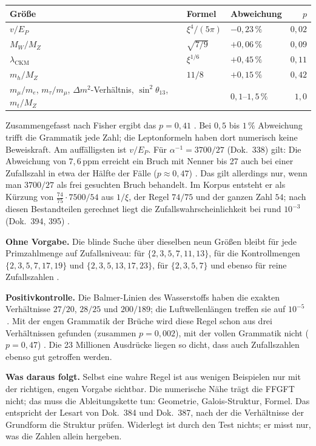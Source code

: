 \begin{center}
\small
\begin{tabular}{@{}lllr@{}}
\toprule
\textbf{Größe} & \textbf{Formel} & \textbf{Abweichung} & \textbf{$p$} \\
\midrule
$v/E_P$ & $\xi^4/(5\pi)$ & $-0{,}23\,\%$ & $0{,}02$ \\
$M_W/M_Z$ & $\sqrt{7/9}$ & $+0{,}06\,\%$ & $0{,}09$ \\
$\lambda_{\mathrm{CKM}}$ & $\xi^{1/6}$ & $+0{,}45\,\%$ & $0{,}11$ \\
$m_h/M_Z$ & $11/8$ & $+0{,}15\,\%$ & $0{,}42$ \\
$m_\mu/m_e$, $m_\tau/m_\mu$, $\Delta m^2$-Verhältnis, $\sin^2\theta_{13}$, $m_t/M_Z$ &  & $0{,}1$--$1{,}5\,\%$ & $1{,}0$ \\
\bottomrule
\end{tabular}
\end{center}

\noindent Zusammengefasst nach Fisher ergibt das $p=0{,}41$ \KM. Bei $0{,}5$ bis $1\,\%$ Abweichung
trifft die Grammatik jede Zahl; die Leptonformeln haben dort numerisch keine Beweiskraft. Am
auffälligsten ist $v/E_P$. Für $\alpha^{-1}=3700/27$ (Dok.~338) gilt: Die Abweichung von $7{,}6$\,ppm
erreicht ein Bruch mit Nenner bis 27 auch bei einer Zufallszahl in etwa der Hälfte der Fälle
($p\approx0{,}47$) \KM. Das gilt allerdings nur, wenn man $3700/27$ als frei gesuchten Bruch
behandelt. Im Korpus entsteht er als Kürzung von $\tfrac{74}{75}\cdot7500/54$ aus $1/\xi$, der Regel
$74/75$ und der ganzen Zahl $54$; nach diesen Bestandteilen gerechnet liegt die
Zufallswahrscheinlichkeit bei rund $10^{-3}$ (Dok.~394, 395) \KM.

\textbf{Ohne Vorgabe.} Die blinde Suche über dieselben neun Größen bleibt für jede Primzahlmenge auf
Zufallsniveau: für $\{2,3,5,7,11,13\}$, für die Kontrollmengen $\{2,3,5,7,17,19\}$ und
$\{2,3,5,13,17,23\}$, für $\{2,3,5,7\}$ und ebenso für reine Zufallszahlen \KM.

\textbf{Positivkontrolle.} Die Balmer-Linien des Wasserstoffs haben die exakten Verhältnisse
$27/20$, $28/25$ und $200/189$; die Luftwellenlängen treffen sie auf $10^{-5}$ \QM\,\cite{NIST}. Mit
der engen Grammatik der Brüche wird diese Regel schon aus drei Verhältnissen gefunden (zusammen
$p=0{,}002$), mit der vollen Grammatik nicht ($p=0{,}47$) \KM. Die 23 Millionen Ausdrücke liegen so
dicht, dass auch Zufallszahlen ebenso gut getroffen werden.

\textbf{Was daraus folgt.} Selbst eine wahre Regel ist aus wenigen Beispielen nur mit der richtigen,
engen Vorgabe sichtbar. Die numerische Nähe trägt die FFGFT nicht; das muss die Ableitungskette tun:
Geometrie, Galois-Struktur, Formel. Das entspricht der Lesart von Dok.~384 und Dok.~387, nach der die
Verhältnisse der Grundform die Struktur prüfen. Widerlegt ist durch den Test nichts; er misst nur,
was die Zahlen allein hergeben.

